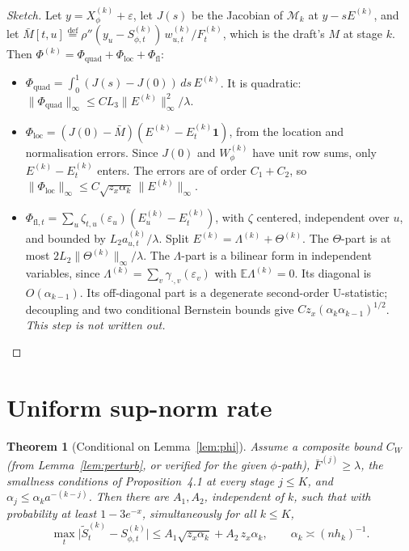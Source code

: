 \documentclass[11pt]{article}
\newcommand{\E}{\mathbb{E}}
\newcommand{\defeq}{\stackrel{\mathrm{def}}{=}}
\newcommand{\norm}[1]{\lVert#1\rVert}
\newcommand{\IMFt}{\widetilde S}
\newtheorem{theorem}[proposition]{Theorem}
\theoremstyle{definition}
\begin{document}
\begin{proof}[Sketch]
Let \(y=X^{(k)}_\phi+\varepsilon\), let \(J(s)\) be the Jacobian of \(\mathcal M_k\)
at \(y-sE^{(k)}\), and let \(\bar M[t,u]\defeq\rho''(y_u-S^{(k)}_{\phi,t})\,w^{(k)}_{u,t}/F^{(k)}_t\),
which is the draft's \(M\) at stage \(k\).  Then
\(\Phi^{(k)}=\Phi_{\mathrm{quad}}+\Phi_{\mathrm{loc}}+\Phi_{\mathrm{fl}}\):
\begin{itemize}
\item \(\Phi_{\mathrm{quad}}=\int_0^1(J(s)-J(0))\,ds\,E^{(k)}\).  It is
  quadratic: \(\norm{\Phi_{\mathrm{quad}}}_\infty\le CL_3\norm{E^{(k)}}_\infty^2/\lambda\).
\item \(\Phi_{\mathrm{loc}}=(J(0)-\bar M)(E^{(k)}-E^{(k)}_t\mathbf1)\), from
  the location and normalisation errors.  Since \(J(0)\) and
  \(W^{(k)}_\phi\) have unit row sums, only \(E^{(k)}-E^{(k)}_t\) enters.
  The errors are of order \(C_1+C_2\), so
  \(\norm{\Phi_{\mathrm{loc}}}_\infty\le C\sqrt{z_x\alpha_k}\,\norm{E^{(k)}}_\infty\).
\item \(\Phi_{\mathrm{fl},t}=\sum_u\zeta_{t,u}(\varepsilon_u)(E^{(k)}_u-E^{(k)}_t)\),
  with \(\zeta\) centered, independent over \(u\), and bounded by
  \(L_2a^{(k)}_{u,t}/\lambda\).  Split \(E^{(k)}=\Lambda^{(k)}+\Theta^{(k)}\).
  The \(\Theta\)-part is at most \(2L_2\norm{\Theta^{(k)}}_\infty/\lambda\).
  The \(\Lambda\)-part is a bilinear form in independent variables, since
  \(\Lambda^{(k)}=\sum_v\gamma_{\cdot,v}(\varepsilon_v)\) with
  \(\E\Lambda^{(k)}=0\).  Its diagonal is \(O(\alpha_{k-1})\).  Its
  off-diagonal part is a degenerate second-order U-statistic; decoupling and
  two conditional Bernstein bounds give \(Cz_x(\alpha_k\alpha_{k-1})^{1/2}\).
  \emph{This step is not written out.}
\end{itemize}
\end{proof}

\section{Uniform sup-norm rate}

\begin{theorem}[Conditional on Lemma~\ref{lem:phi}]\label{thm:main}
Assume a composite bound \(C_W\) (from Lemma~\ref{lem:perturb}, or verified
for the given \(\phi\)-path), \(\bar F^{(j)}\ge\lambda\), the smallness
conditions of Proposition~4.1 at every stage \(j\le K\), and
\(\alpha_j\le\alpha_ka^{-(k-j)}\).  Then there are \(A_1,A_2\), independent of
\(k\), such that with probability at least \(1-3e^{-x}\), simultaneously for
all \(k\le K\),
\[
  \max_t\bigl|\IMFt^{(k)}_t-S^{(k)}_{\phi,t}\bigr|\le A_1\sqrt{z_x\alpha_k}+A_2\,z_x\alpha_k,
  \qquad\alpha_k\asymp(nh_k)^{-1}.
\]
\end{theorem}
\end{document}
